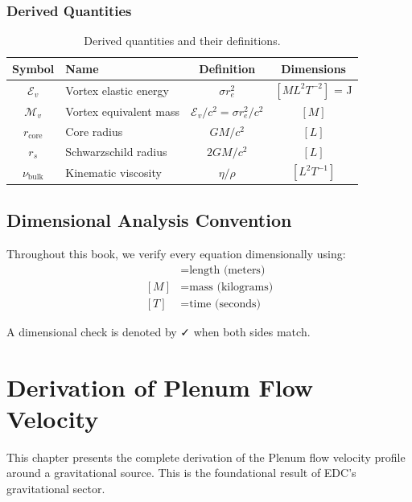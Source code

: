 \documentclass[12pt,a4paper,openany]{book}
\theoremstyle{definition}
\theoremstyle{plain}
\theoremstyle{remark}
\newcommand{\Mv}{\mathcal{M}_v}           %
\newcommand{\Ev}{\mathcal{E}_v}           %
\newcommand{\re}{r_e}                      %
\newcommand{\rcore}{r_{\text{core}}}       %
\newcommand{\nubulk}{\nu_{\text{bulk}}}    %
\newcommand{\rs}{r_s}                      %
\begin{document}
\subsection{Derived Quantities}

\begin{table}[H]
\centering
\begin{tabular}{|c|l|c|c|}
\hline
\textbf{Symbol} & \textbf{Name} & \textbf{Definition} & \textbf{Dimensions} \\
\hline
$\Ev$ & Vortex elastic energy & $\sigma \re^2$ & $[M L^2 T^{-2}]$ = J \\
$\Mv$ & Vortex equivalent mass & $\Ev/c^2 = \sigma \re^2/c^2$ & $[M]$ \\
$\rcore$ & Core radius & $GM/c^2$ & $[L]$ \\
$\rs$ & Schwarzschild radius & $2GM/c^2$ & $[L]$ \\
$\nubulk$ & Kinematic viscosity & $\eta/\rho$ & $[L^2 T^{-1}]$ \\
\hline
\end{tabular}
\caption{Derived quantities and their definitions.}
\label{tab:derived}
\end{table}

\section{Dimensional Analysis Convention}

Throughout this book, we verify every equation dimensionally using:
\begin{align}
[L] &= \text{length (meters)} \\
[M] &= \text{mass (kilograms)} \\
[T] &= \text{time (seconds)}
\end{align}

A dimensional check is denoted by ✓ when both sides match.

\chapter{Derivation of Plenum Flow Velocity}

This chapter presents the complete derivation of the Plenum flow velocity profile around a gravitational source. This is the foundational result of EDC's gravitational sector.
\end{document}
